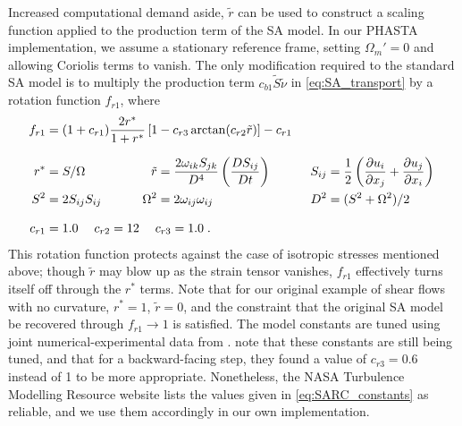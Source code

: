 \documentclass[11pt]{article}
\begin{document}
Increased computational demand aside, $\tilde{r}$ can be used to construct a scaling function applied to the production term of the SA model. In our PHASTA implementation, we assume a stationary reference frame, setting $\Omega_m' = 0$ and allowing Coriolis terms to vanish. The only modification required to the standard SA model is to multiply the production term $c_{b1} \tilde{S} \tilde{\nu}$ in \eqref{eq:SA_transport} by a rotation function $f_{r1}$, where
\begin{align}
	&\begin{aligned}
		\mathllap{f_{r1}} = (1 + c_{r1}) \frac{2 r^*}{1 + r^*} \left[ 1 - c_{r3} \arctan(c_{r2} \tilde{r}) \right] - c_{r1}
		\;
		\label{eq:SARC_rotation_function}
	\end{aligned}\\[0.25cm]
	\phantom{f_{r1}}
	&\begin{aligned}
		\mathllap{r^*} &= S / \Omega
		\; &\qquad
		\tilde{r} &= \frac{2 \omega_{ik} S_{jk}}{D^4} \left( \frac{D S_{ij}}{D t} \right)
		\; &\qquad
		S_{ij} &= \frac{1}{2} \left( \pp{u_i}{x_j} + \pp{u_j}{x_i} \right)
		\; \\
		\mathllap{S^2} &= 2 S_{ij} S_{ij}
		\; &\qquad
		\Omega^2 &= 2 \omega_{ij} \omega_{ij}
		\; &\qquad
		D^2 &= (S^2 + \Omega^2) / 2
		\label{eq:SARC_definitions}
	\end{aligned}\\[0.25cm]
	&\begin{aligned}
		\mathllap{c_{r1}} &= 1.0
		\; \quad
		c_{r2} = 12
		\; \quad
		c_{r3} = 1.0
		\;.
		\label{eq:SARC_constants}
	\end{aligned}
\end{align}
This rotation function protects against the case of isotropic stresses mentioned above; though $\tilde{r}$ may blow up as the strain tensor vanishes, $f_{r1}$ effectively turns itself off through the $r^*$ terms. Note that for our original example of shear flows with no curvature, $r^* = 1$, $\tilde{r} = 0$, and the constraint that the original SA model be recovered through $f_{r1} \rightarrow 1$ is satisfied. The model constants are tuned using joint numerical-experimental data from \citet{dacles1995}. \citep{shur2000} note that these constants are still being tuned, and that for a backward-facing step, they found a value of $c_{r3} = 0.6$ instead of 1 to be more appropriate. Nonetheless, the NASA Turbulence Modelling Resource website lists the values given in \eqref{eq:SARC_constants} as reliable, and we use them accordingly in our own implementation.
\end{document}
